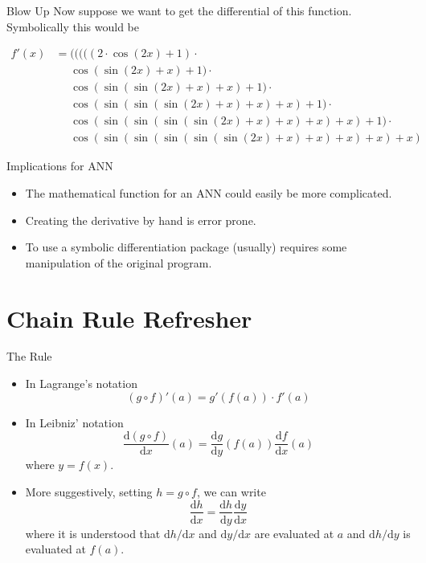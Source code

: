 \documentclass{beamer}
\begin{document}
\begin{frame}[fragile]{Blow Up}
Now suppose we want to get the differential of this
function. Symbolically this would be

$$
\begin{aligned}
f'(x) &=           (((((2\cdot \cos(2x)+1)\cdot \\
      &\phantom{=} \cos(\sin(2x)+x)+1)\cdot \\
      &\phantom{=} \cos(\sin(\sin(2x)+x)+x)+1)\cdot \\
      &\phantom{=} \cos(\sin(\sin(\sin(2x)+x)+x)+x)+1)\cdot \\
      &\phantom{=} \cos(\sin(\sin(\sin(\sin(2x)+x)+x)+x)+x)+1)\cdot \\
      &\phantom{=} \cos(\sin(\sin(\sin(\sin(\sin(2x)+x)+x)+x)+x)+x)
\end{aligned}
$$
\end{frame}

\begin{frame}[fragile]{Implications for ANN}
\begin{itemize}
\item The mathematical function for an ANN could easily be more
  complicated.
\item Creating the derivative by hand is error prone.
\item To use a symbolic differentiation package (usually) requires
  some manipulation of the original program.
\end{itemize}
\end{frame}

\section{Chain Rule Refresher}

\begin{frame}[fragile]{The Rule}
\begin{itemize}
\item
In Lagrange's notation
$$
(g \circ f)'(a) = g'(f(a))\cdot f'(a)
$$
\item
In Leibniz' notation
$$
\frac{\mathrm{d} (g \circ f)}{\mathrm{d} x}(a) =
\frac{\mathrm{d} g}{\mathrm{d} y}(f(a)) \frac{\mathrm{d} f}{\mathrm{d} x}(a)
$$
where $y = f(x)$.
\item
More suggestively, setting $h = g \circ f$, we can write
$$
\frac{\mathrm{d} h}{\mathrm{d} x} =
\frac{\mathrm{d} h}{\mathrm{d} y} \frac{\mathrm{d} y}{\mathrm{d} x}
$$
where it is understood that $\mathrm{d} h / \mathrm{d} x$ and
$\mathrm{d} y / \mathrm{d} x$ are evaluated at $a$ and $\mathrm{d} h /
\mathrm{d} y$ is evaluated at $f(a)$.
\end{itemize}
\end{frame}
\end{document}
